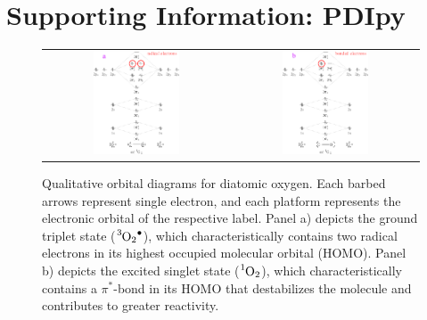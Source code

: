\section{Supporting Information: PDIpy}

\begin{figure}
    \centering
    \begin{tabular}{c|c}
        \includegraphics[width = 0.48\textwidth]{images/PDIpy/triplet_mo_diagram.png}
        & \includegraphics[width = 0.48\textwidth]{images/PDIpy/singlet_mo_diagram.png} \\
    \end{tabular}
    \caption{
        Qualitative orbital diagrams for diatomic oxygen. Each barbed arrows represent single electron, and each platform represents the electronic orbital of the respective label. Panel a) depicts the ground triplet state ($\ce{^3O2^.}$), which characteristically contains two radical electrons in its highest occupied molecular orbital (HOMO). Panel b) depicts the excited singlet state ($\ce{^1O2}$), which characteristically contains a $\pi^*$-bond in its HOMO that destabilizes the molecule and contributes to greater reactivity.
    }
    \label{mo_diagrams}
\end{figure}


